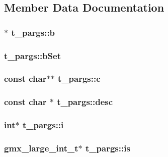 \subsection{\-Member \-Data \-Documentation}
\hypertarget{structt__pargs_ab0d310567577d9fda0379251855d34e1}{
\subsubsection[{b}]{$\ast$ {\bf t\-\_\-pargs\-::b}}}\label{structt__pargs_ab0d310567577d9fda0379251855d34e1}
\hypertarget{structt__pargs_af4b4468c6fecd8fe77f3551c12436fa8}{
\subsubsection[{b\-Set}]{ {\bf t\-\_\-pargs\-::b\-Set}}}\label{structt__pargs_af4b4468c6fecd8fe77f3551c12436fa8}
\hypertarget{structt__pargs_a3fa536862b27057739745502ea637baf}{
\subsubsection[{c}]{\setlength{\rightskip}{0pt plus 5cm}const char$\ast$$\ast$ {\bf t\-\_\-pargs\-::c}}}\label{structt__pargs_a3fa536862b27057739745502ea637baf}
\hypertarget{structt__pargs_ac9917ef459b5cbb8b5155d9f467fbcc1}{
\subsubsection[{desc}]{\setlength{\rightskip}{0pt plus 5cm}const char $\ast$ {\bf t\-\_\-pargs\-::desc}}}\label{structt__pargs_ac9917ef459b5cbb8b5155d9f467fbcc1}
\hypertarget{structt__pargs_aa7de62f02164554c161898ab7b15ec1d}{
\subsubsection[{i}]{\setlength{\rightskip}{0pt plus 5cm}int$\ast$ {\bf t\-\_\-pargs\-::i}}}\label{structt__pargs_aa7de62f02164554c161898ab7b15ec1d}
\hypertarget{structt__pargs_af2c1c09707cc18ae66fa7d44a029eb59}{
\subsubsection[{is}]{\setlength{\rightskip}{0pt plus 5cm}gmx\-\_\-large\-\_\-int\-\_\-t$\ast$ {\bf t\-\_\-pargs\-::is}}}\label{structt__pargs_af2c1c09707cc18ae66fa7d44a029eb59}
